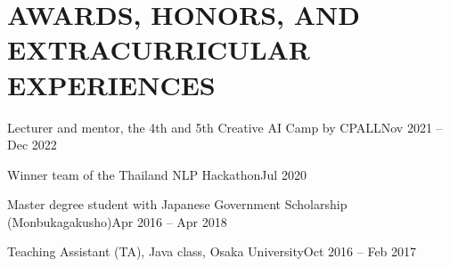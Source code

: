 \section{AWARDS, HONORS, AND EXTRACURRICULAR EXPERIENCES}
  \resumeSubHeadingListStart
    \resumeSubheading
      {Lecturer and mentor, the 4th and 5th Creative AI Camp by CPALL}{Nov 2021 -- Dec 2022} {} {}
      \vspace{-15pt}  
      
    \resumeSubheading
      {Winner team of the Thailand NLP Hackathon}{Jul 2020} {} {}
      \vspace{-15pt}

    \resumeSubheading
      {Master degree student with Japanese Government Scholarship (Monbukagakusho)}{Apr 2016 -- Apr 2018}
      {} {}
      \vspace{-15pt}
    
    \resumeSubheading
      {Teaching Assistant (TA), Java class, Osaka University}{Oct 2016 -- Feb 2017}
      {}{}
      \vspace{-15pt}

  \resumeSubHeadingListEnd
  